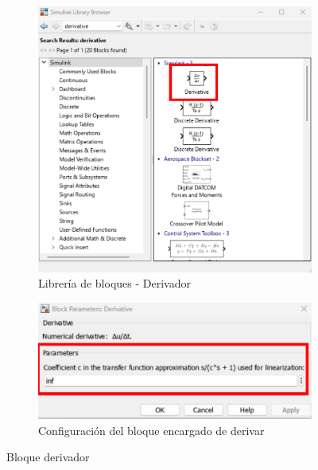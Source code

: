 \begin{figure}[htbp]
    \centering
    \begin{subfigure}[b]{0.35\textwidth}
        \centering
        \includegraphics[width=\textwidth]{fig/Capitulo5/Caso_de_estudio_PID/lib_derivative.pdf}
        \caption{Librería de bloques - Derivador}
        \label{fig:dev_PID_lib}
    \end{subfigure}
    \hfill
    \begin{subfigure}[b]{0.45\textwidth}
        \centering
        \includegraphics[width=\textwidth]{fig/Capitulo5/Caso_de_estudio_PID/config_derivative.pdf}
        \caption{Configuración del bloque encargado de derivar}
        \label{fig:dev_PID_conf}
    \end{subfigure}
    \caption{Bloque derivador}
    \label{fig:dev_block}
\end{figure}

